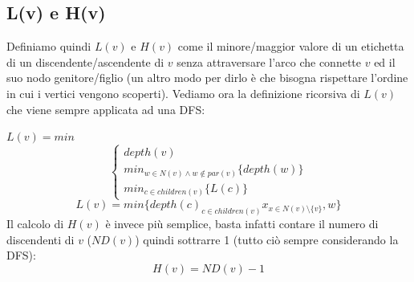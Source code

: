 \documentclass[12pt,a4paper]{article}
\begin{document}
\subsection{L(v) e H(v)}
Definiamo quindi $L(v)$ e $H(v)$ come il minore/maggior valore di un etichetta di un discendente/ascendente di $v$ senza attraversare l'arco che connette $v$ ed il suo nodo genitore/figlio (un altro modo per dirlo è che bisogna rispettare l'ordine in cui i vertici vengono scoperti). Vediamo ora la definizione ricorsiva di $L(v)$ che viene sempre applicata ad una DFS:

$L(v) = min$
\begin{equation}
    \begin{cases}
      depth(v)\\
      min_{w \in N(v) \wedge w \notin par(v)} \lbrace depth(w) \rbrace\\
      min_{c \in children(v)} \lbrace L(c) \rbrace
    \end{cases}
\end{equation}
$$L(v) = min \lbrace depth(c)_{c \in children(v)} x_{x \in N(v) \setminus \lbrace v \rbrace} , w \rbrace$$
Il calcolo di $H(v)$ è invece più semplice, basta infatti contare il numero di discendenti di $v$ ($ND(v)$) quindi sottrarre 1 (tutto ciò sempre considerando la DFS):
$$H(v) = ND(v) - 1$$
\end{document}
